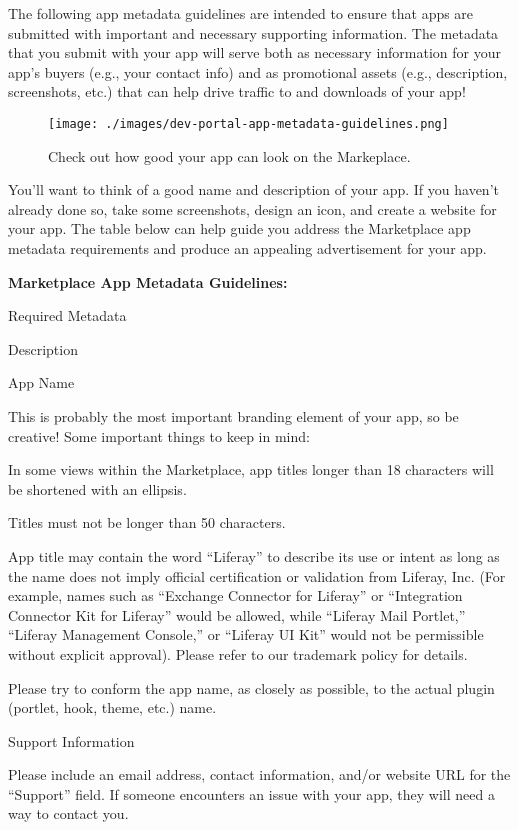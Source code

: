 The following app metadata guidelines are intended to ensure that apps
are submitted with important and necessary supporting information. The
metadata that you submit with your app will serve both as necessary
information for your app's buyers (e.g., your contact info) and as
promotional assets (e.g., description, screenshots, etc.) that can help
drive traffic to and downloads of your app!

\begin{figure}
\centering
\texttt{[image: ./images/dev-portal-app-metadata-guidelines.png]}
\caption{Check out how good your app can look on the Markeplace.}
\end{figure}

You'll want to think of a good name and description of your app. If you
haven't already done so, take some screenshots, design an icon, and
create a website for your app. The table below can help guide you
address the Marketplace app metadata requirements and produce an
appealing advertisement for your app.

\textbf{Marketplace App Metadata Guidelines:}

Required Metadata

Description

App Name

This is probably the most important branding element of your app, so be
creative! Some important things to keep in mind:

In some views within the Marketplace, app titles longer than 18
characters will be shortened with an ellipsis.

Titles must not be longer than 50 characters.

App title may contain the word ``Liferay'' to describe its use or intent
as long as the name does not imply official certification or validation
from Liferay, Inc. (For example, names such as ``Exchange Connector for
Liferay'' or ``Integration Connector Kit for Liferay'' would be allowed,
while ``Liferay Mail Portlet,'' ``Liferay Management Console,'' or
``Liferay UI Kit'' would not be permissible without explicit approval).
Please refer to our trademark policy for details.

Please try to conform the app name, as closely as possible, to the
actual plugin (portlet, hook, theme, etc.) name.

Support Information

Please include an email address, contact information, and/or website URL
for the ``Support'' field. If someone encounters an issue with your app,
they will need a way to contact you.

